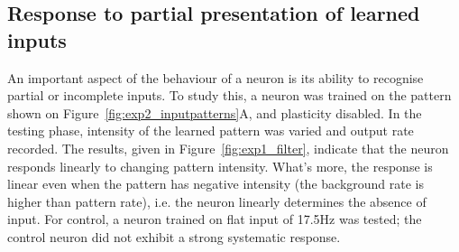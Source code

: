 \documentclass[a4paper,12pt]{report}
\theoremstyle{definition}
\begin{document}
\begin{figure}[!htb]
\begin{minipage}[t]{.5\textwidth}
  \captionsetup{width=0.95\linewidth}
  \label{fig:exp5_patterncompletion}
\end{minipage}
\end{figure}







\subsection{Response to partial presentation of learned inputs}
\label{subsec:partialpatterns}


An important aspect of the behaviour of a neuron is its ability to recognise partial or incomplete inputs. To study this, a neuron was trained on the pattern shown on Figure~\ref{fig:exp2_inputpatterns}A, and plasticity disabled. In the testing phase, intensity of the learned pattern was varied and output rate recorded. The results, given in Figure~\ref{fig:exp1_filter}, indicate that the neuron responds linearly to changing pattern intensity. What's more, the response is linear even when the pattern has negative intensity (the background rate is higher than pattern rate), i.e. the neuron linearly determines the absence of input. For control, a neuron trained on flat input of 17.5Hz was tested; the control neuron did not exhibit a strong systematic response.


\end{document}

